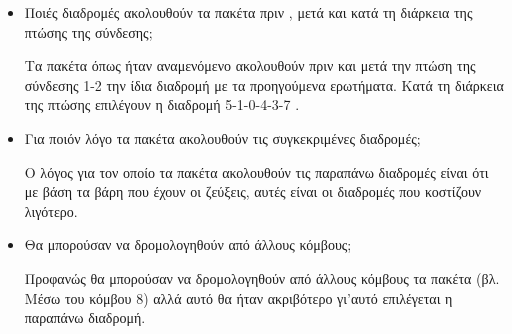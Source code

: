 \documentclass[a4paper,9pt]{article}
\begin{document}
\begin{itemize}
    \item Ποιές διαδρομές ακολουθούν τα πακέτα πριν , μετά και κατά τη διάρκεια της
        πτώσης της σύνδεσης;

        Τα πακέτα όπως ήταν αναμενόμενο ακολουθούν πριν και μετά την πτώση της
        σύνδεσης 1-2 την ίδια διαδρομή με τα προηγούμενα ερωτήματα. Κατά τη διάρκεια
        της πτώσης επιλέγουν η διαδρομή 5-1-0-4-3-7 .

    \item Για ποιόν λόγο τα πακέτα ακολουθούν τις συγκεκριμένες διαδρομές;

        Ο λόγος για τον οποίο τα πακέτα ακολουθούν τις παραπάνω διαδρομές είναι ότι με
        βάση τα βάρη που έχουν οι ζεύξεις, αυτές είναι οι διαδρομές που κοστίζουν
        λιγότερο.

    \item Θα μπορούσαν να δρομολογηθούν από άλλους κόμβους;

        Προφανώς θα μπορούσαν να δρομολογηθούν από άλλους κόμβους τα πακέτα (βλ. Μέσω
        του κόμβου 8) αλλά αυτό θα ήταν ακριβότερο γι’αυτό επιλέγεται η παραπάνω
        διαδρομή.
\end{itemize}
\end{document}
